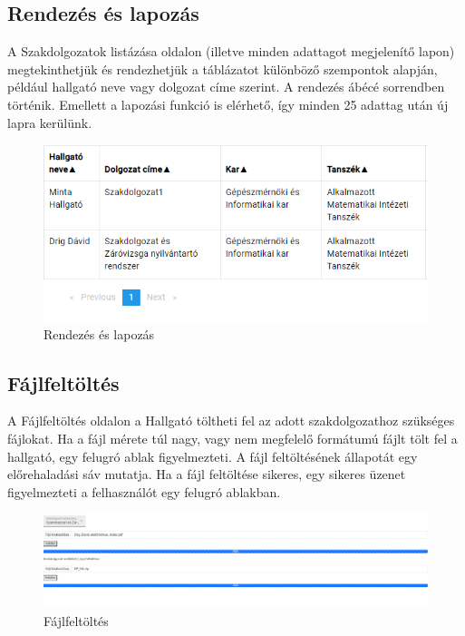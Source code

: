 
\subsection{Rendezés és lapozás}

A Szakdolgozatok listázása oldalon (illetve minden adattagot megjelenítő lapon) megtekinthetjük és rendezhetjük a táblázatot különböző szempontok alapján, például hallgató neve vagy dolgozat címe szerint. A rendezés ábécé sorrendben történik. Emellett a lapozási funkció is elérhető, így minden 25 adattag után új lapra kerülünk.

\begin{figure}[h!]
\centering
\includegraphics[width=\textwidth]{images/Orderby_pagination.png}
\caption{Rendezés és lapozás}
\label{fig:Orderby_pagination}
\end{figure}

\subsection{Fájlfeltöltés}

A Fájlfeltöltés oldalon a Hallgató töltheti fel az adott szakdolgozathoz szükséges fájlokat. Ha a fájl mérete túl nagy, vagy nem megfelelő formátumú fájlt tölt fel a hallgató, egy felugró ablak figyelmezteti. A fájl feltöltésének állapotát egy előrehaladási sáv mutatja. Ha a fájl feltöltése sikeres, egy sikeres üzenet figyelmezteti a felhasználót egy felugró ablakban.


\begin{figure}[h!]
\centering
\includegraphics[width=\textwidth]{images/Upload_files.png}
\caption{Fájlfeltöltés}
\label{fig:Upload_files}
\end{figure}



